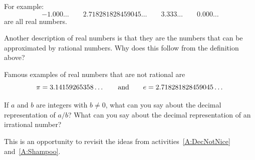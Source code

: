 For example:
\[
-1.000\dots \qquad 2.718281828459045\dots \qquad 3.333\dots \qquad 0.000\dots
\]
are all real numbers.

\begin{question} 
Another description of real numbers is that they are the numbers that
can be approximated by rational numbers. Why does this follow from the
definition above?
\end{question}
\QM

Famous examples of real numbers that are not rational are
\[\index{e@$e$}\index{pi@$\pi$}
\pi = 3.14159265358\dots\qquad \text{and}\qquad e = 2.718281828459045\dots
\]

\begin{question}
If $a$ and $b$ are integers with $b \ne 0$, what can you say about the
decimal representation of $a/b$? What can you say about the decimal
representation of an irrational number?
\end{question}
\QM


\begin{teachingnote}
This is an opportunity to revisit the ideas from activities~\ref{A:DecNotNice} and~\ref{A:Shampoo}. 
\end{teachingnote}


\newpage

